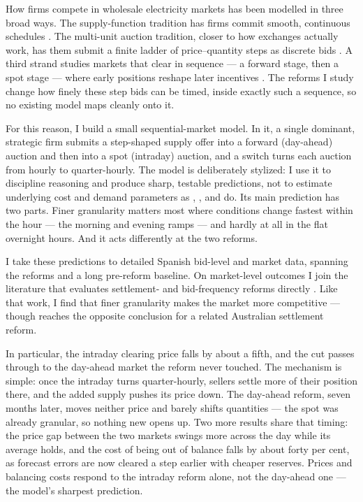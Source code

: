 \documentclass[11pt,a4paper]{article}
\theoremstyle{definition}
\theoremstyle{remark}
\theoremstyle{plain}
\begin{document}
How firms compete in wholesale electricity markets has been modelled in three broad ways. The supply-function tradition has firms commit smooth, continuous schedules \citep{klemperer_meyer_1989, green_newbery_1992}. The multi-unit auction tradition, closer to how exchanges actually work, has them submit a finite ladder of price--quantity steps as discrete bids \citep{von_der_fehr_harbord_1993, fabra_vdf_harbord_2006, fabra_llobet_2023}. A third strand studies markets that clear in sequence --- a forward stage, then a spot stage --- where early positions reshape later incentives \citep{allaz_vila_1993, de_frutos_fabra_2012, ito_reguant_2016}. The reforms I study change how finely these step bids can be timed, inside exactly such a sequence, so no existing model maps cleanly onto it.

For this reason, I build a small sequential-market model. In it, a single dominant, strategic firm submits a step-shaped supply offer into a forward (day-ahead) auction and then into a spot (intraday) auction, and a switch turns each auction from hourly to quarter-hourly. The model is deliberately stylized: I use it to discipline reasoning and produce sharp, testable predictions, not to estimate underlying cost and demand parameters as \citet{wolak_2003}, \citet{hortacsu_puller_2008}, and \citet{kastl_2005} do. Its main prediction has two parts. Finer granularity matters most where conditions change fastest within the hour --- the morning and evening ramps --- and hardly at all in the flat overnight hours. And it acts differently at the two reforms.

I take these predictions to detailed Spanish bid-level and market data, spanning the reforms and a long pre-reform baseline. On market-level outcomes I join the literature that evaluates settlement- and bid-frequency reforms directly \citep{markle_huss_2017, csereklyei_khezr_2024}. Like that work, I find that finer granularity makes the market more competitive --- though \citet{chang_2026} reaches the opposite conclusion for a related Australian settlement reform. 

In particular, the intraday clearing price falls by about a fifth, and the cut passes through to the day-ahead market the reform never touched. The mechanism is simple: once the intraday turns quarter-hourly, sellers settle more of their position there, and the added supply pushes its price down. The day-ahead reform, seven months later, moves neither price and barely shifts quantities --- the spot was already granular, so nothing new opens up. Two more results share that timing: the price gap between the two markets swings more across the day while its average holds, and the cost of being out of balance falls by about forty per cent, as forecast errors are now cleared a step earlier with cheaper reserves. Prices and balancing costs respond to the intraday reform alone, not the day-ahead one --- the model's sharpest prediction.
\end{document}
